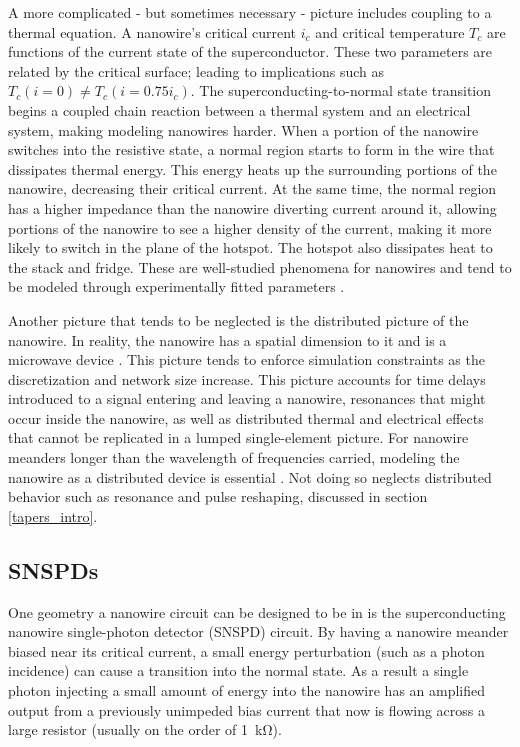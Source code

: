 A more complicated - but sometimes necessary - picture includes coupling to a thermal equation.
A nanowire's critical current $i_c$ and critical temperature $T_c$ are
functions of the current state of the superconductor. These two parameters are related by the critical
surface; leading to implications such as $T_c(i=0) \neq T_c(i=0.75i_c)$. 
The superconducting-to-normal state transition
begins a coupled chain reaction between a thermal system and an electrical system, making
modeling nanowires harder. When a portion of the nanowire switches into the resistive 
state, a normal region starts to form in the wire that dissipates thermal energy. This
energy heats up the surrounding portions of the nanowire, decreasing their critical 
current. At the same time, the normal region has a higher impedance than the nanowire
diverting current around it, allowing portions of the nanowire to see a higher density of
the current, making it more likely to switch in the plane of the hotspot. The hotspot also
dissipates heat to the stack and fridge. These are well-studied phenomena for nanowires
and tend to be modeled through experimentally fitted parameters \cite{phen_model, karl_spice}. 

Another picture that tends to be neglected is the distributed picture of the nanowire.
In reality, the nanowire has a spatial dimension to it and is a microwave device
\cite{distributed_nanowire_model, santavicca_microwave}. This
picture tends to enforce simulation constraints as the discretization and network size
increase. This picture accounts for time delays introduced to a signal entering and
leaving a nanowire, resonances that might occur inside the nanowire, as well as distributed
thermal and electrical effects that cannot be replicated 
in a lumped single-element picture. For nanowire meanders
longer than the wavelength of frequencies carried, modeling the nanowire as a distributed device
is essential \cite{distributed_nanowire_model}. Not doing so neglects distributed behavior such as resonance and pulse reshaping, discussed in section \ref{tapers_intro}.



\subsection{SNSPDs}

One geometry a nanowire circuit can be designed to be in is the superconducting nanowire 
single-photon detector (SNSPD) circuit. By having a nanowire meander biased near
its critical current, a small energy perturbation (such as a photon incidence)
can cause a transition into the normal state. As a result a single photon injecting
a small amount of energy into the nanowire has an amplified output from a previously
unimpeded bias 
current that now is flowing across a large resistor (usually on the order of 
\qty{1}{\kilo\ohm}).

